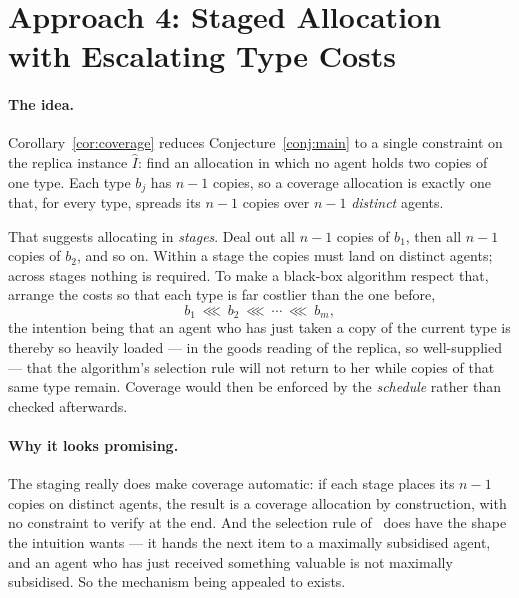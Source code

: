 \section{Approach 4: Staged Allocation with Escalating Type Costs}
\label{sec:approach4}

\paragraph{The idea.} Corollary~\ref{cor:coverage} reduces
Conjecture~\ref{conj:main} to a single constraint on the replica instance
$\hat{I}$: find an allocation in which no agent holds two copies of one type.
Each type $b_j$ has $n-1$ copies, so a coverage allocation is exactly one that,
for every type, spreads its $n-1$ copies over $n-1$ \emph{distinct} agents.

That suggests allocating in \emph{stages}. Deal out all $n-1$ copies of $b_1$,
then all $n-1$ copies of $b_2$, and so on. Within a stage the copies must land on
distinct agents; across stages nothing is required. To make a black-box
algorithm respect that, arrange the costs so that each type is far costlier than
the one before,
\[
  b_1 \ \lll \ b_2 \ \lll \ \cdots \ \lll \ b_m ,
\]
the intention being that an agent who has just taken a copy of the current type
is thereby so heavily loaded --- in the goods reading of the replica, so
well-supplied --- that the algorithm's selection rule will not return to her
while copies of that same type remain. Coverage would then be enforced by the
\emph{schedule} rather than checked afterwards.

\paragraph{Why it looks promising.} The staging really does make coverage
automatic: if each stage places its $n-1$ copies on distinct agents, the result
is a coverage allocation by construction, with no constraint to verify at the
end. And the selection rule of~\cite{BKNS22} does have the shape the intuition
wants --- it hands the next item to a maximally subsidised agent, and an agent
who has just received something valuable is not maximally subsidised. So the
mechanism being appealed to exists.

